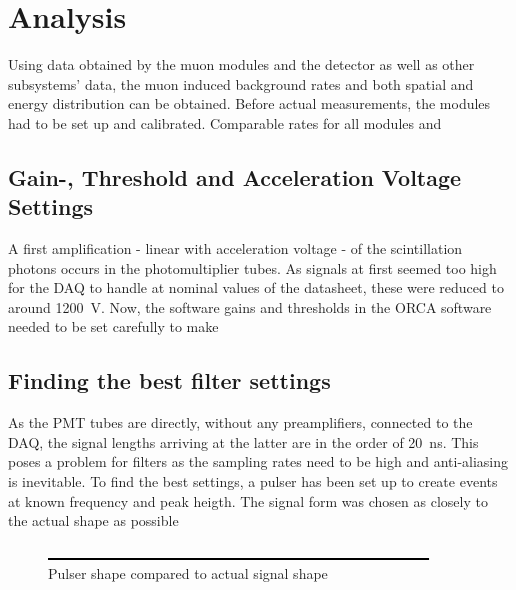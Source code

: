 %

\chapter{Analysis}
\label{ch:Analysis}
  Using data obtained by the muon modules and the detector as well as other subsystems' data, the muon induced background rates and both spatial and energy distribution can be obtained. Before actual measurements, the modules had to be set up and calibrated. Comparable rates for all modules and 

  \section{Gain-, Threshold and Acceleration Voltage Settings}
  \label{ch:Analysis:sec:GainsThresholdsAccVoltages}
  
  A first amplification - linear with acceleration voltage - of the scintillation photons occurs in the photomultiplier tubes. As signals at first seemed too high for the DAQ to handle at nominal values of the datasheet, these were reduced to around \SI{1200}{\volt}. Now, the software gains and thresholds in the ORCA software needed to be set carefully to make 
  
  
  \section{Finding the best filter settings}
  \label{ch:Analysis:sec:Finding the best filter settings}
  As the PMT tubes are directly, without any preamplifiers, connected to the DAQ, the signal lengths arriving at the latter are in the order of \SI{20}{\nano\second}. This poses a problem for filters as the sampling rates need to be high and anti-aliasing is inevitable. To find the best settings, a pulser has been set up to create events at known frequency and peak heigth. The signal form  was chosen as closely to the actual shape as possible
 
  \begin{figure}
	\caption{Pulser shape compared to actual signal shape}
  	\includegraphics[width = 0.9\textwidth]{graphics/dummy.eps}
  \end{figure}
  
